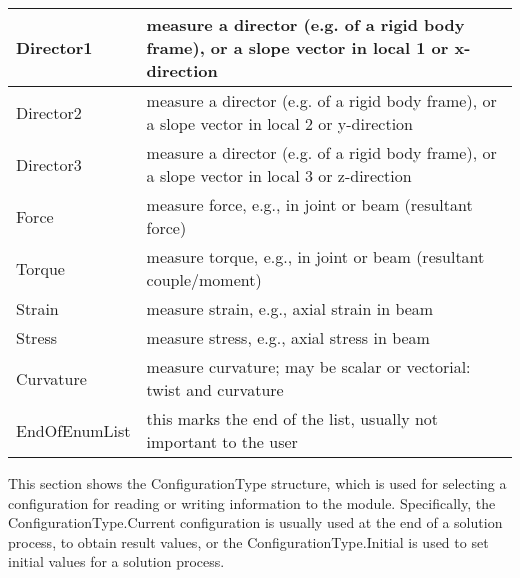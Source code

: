 \begin{center}
\begin{longtable}{| p{8cm} | p{8cm} |}
  Director1 & measure a director (e.g. of a rigid body frame), or a slope vector in local 1 or x-direction\\ \hline 
  Director2 & measure a director (e.g. of a rigid body frame), or a slope vector in local 2 or y-direction\\ \hline 
  Director3 & measure a director (e.g. of a rigid body frame), or a slope vector in local 3 or z-direction\\ \hline 
  Force & measure force, e.g., in joint or beam (resultant force)\\ \hline 
  Torque & measure torque, e.g., in joint or beam (resultant couple/moment)\\ \hline 
  Strain & measure strain, e.g., axial strain in beam\\ \hline 
  Stress & measure stress, e.g., axial stress in beam\\ \hline 
  Curvature & measure curvature; may be scalar or vectorial: twist and curvature\\ \hline 
  EndOfEnumList & this marks the end of the list, usually not important to the user\\ \hline 
\end{longtable}
\end{center}

This section shows the ConfigurationType structure, which is used for selecting a configuration for reading or writing information to the module. Specifically, the ConfigurationType.Current configuration is usually used at the end of a solution process, to obtain result values, or the ConfigurationType.Initial is used to set initial values for a solution process.




